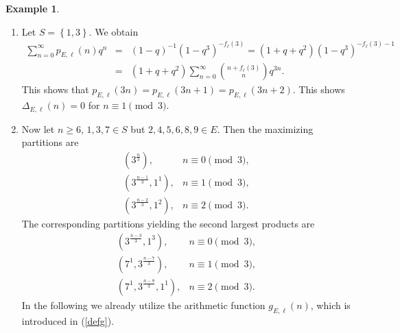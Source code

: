 \documentclass[12pt]{amsart}
\theoremstyle{definition}
\newtheorem{example}{Example}
\theoremstyle{remark}
\numberwithin{theorem}{section} \numberwithin{equation}{section}
\begin{document}
\begin{example}
\label{example13}

\begin{enumerate}
\item  Let $S=\left\{ 1,3\right\}
$.
We obtain
\begin{eqnarray*}
\sum _{n=0}^{\infty }
p_{E,\ell }\left( n\right) q^{n}
&=&
\left( 1-q\right) ^{-1}
\left( 1-q^{3}\right)
^{-f_{\ell }\left( 3\right) }
=\left( 1+q+q^{2}\right)
\left( 1-q^{3}\right)
^{-f_{\ell }\left( 3\right) -1}\\
&=&\left( 1+q+q^{2}\right)
\sum _{n=0}^{\infty }
\binom{n
+f_{\ell }\left( 3\right) }{n}q^{3n}.
\end{eqnarray*}
This shows that
$p_{E,\ell }\left( 3n\right)
=p_{E,\ell }\left( 3n+1\right)
=p_{E,\ell }\left( 3n+2\right)$.
This shows
$\Delta _{E,\ell }\left( n\right)
=0$
for $n\equiv 1\pmod{3}$.

\item  Now let $n\geq6$, $1,3,7
\in S$ but
$2,4,5,6,8,9\in E$.
Then the
maximizing partitions are
\begin{equation}
\begin{array}{rl}
\left( 3^{\frac{n}{3}}\right) ,
&n\equiv 0\pmod{3},\\
\left( 3^{\frac{n-1}{3}},
1^{1}\right) ,
&n\equiv 1\pmod{3},\\
\left( 3^{\frac{n-2}{3}},
1^{2}\right) ,
&n\equiv 2\pmod{3}.
\end{array}
\label{max13}
\end{equation}
The corresponding partitions
yielding the second largest
products are
\[
\begin{array}{rl}
\left( 3^{\frac{n-
3}{3}},
1^{3}\right) ,
&n\equiv 0\pmod{3},\\
\left( 7^{1},
3^{\frac{n-7}{3}}\right) ,
&n\equiv 1\pmod{3},\\\left( 7^{1},3^{\frac{n-8}{3}},1^{1}\right) ,&n\equiv 2\pmod{3}.
\end{array}
\]
In the following we already utilize the arithmetic function $g_{E,\ell}(n)$, which is introduced in (\ref{defg}).


\end{enumerate}
\end{example}
\end{document}
